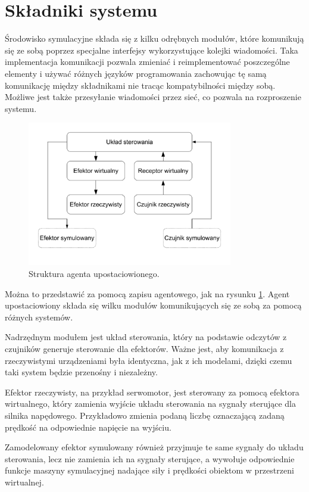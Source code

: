 \section{Składniki systemu}
	Środowisko symulacyjne składa się z kilku odrębnych modułów, które komunikują się ze sobą poprzez specjalne interfejsy wykorzystujące kolejki wiadomości.
	Taka implementacja komunikacji pozwala zmieniać i reimplementować poszczególne elementy i używać różnych języków programowania zachowując tę samą komunikację między składnikami nie tracąc kompatybilności między sobą.
	Możliwe jest także przesyłanie wiadomości przez sieć, co pozwala na rozproszenie systemu.

	\begin{figure}[H]
	\centering
	\includegraphics[width=0.8\textwidth]{graphics/agent.pdf}
	\caption{Struktura agenta upostaciowionego.}
	\label{fig:agent}
	\end{figure} 

	Można to przedstawić za pomocą zapisu agentowego, jak na rysunku \ref{fig:agent}.
	Agent upostaciowiony składa się wilku modułów komunikujących się ze sobą za pomocą różnych systemów.

	Nadrzędnym modułem jest układ sterowania, który na podstawie odczytów z czujników generuje sterowanie dla efektorów.
	Ważne jest, aby komunikacja z rzeczywistymi urządzeniami była identyczna, jak z ich modelami, dzięki czemu taki system będzie przenośny i niezależny.

	Efektor rzeczywisty, na przykład serwomotor, jest sterowany za pomocą efektora wirtualnego, który zamienia wyjście układu sterowania na sygnały sterujące dla silnika napędowego.
	Przykładowo zmienia podaną liczbę oznaczającą zadaną prędkość na odpowiednie napięcie na wyjściu.

	Zamodelowany efektor symulowany również przyjmuje te same sygnały do układu sterowania, lecz nie zamienia ich na sygnały sterujące, a wywołuje odpowiednie funkcje maszyny symulacyjnej nadające siły i prędkości obiektom w przestrzeni wirtualnej.

